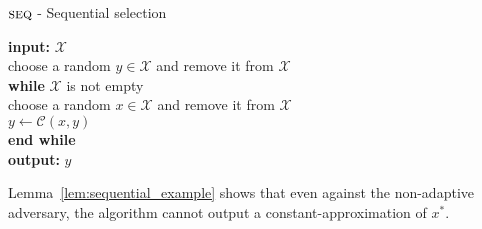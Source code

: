 \documentclass[twoside,11pt]{article}
\newcommand{\cC}{\mathcal{C}}
\newcommand{\cX}{\mathcal{X}}
\newcommand{\algorithms}[1]{\textsc{#1}}
\newcommand{\algseq}{\algorithms{seq}}
\newcommand{\maxx}{x^*}
\begin{document}
\begin{center}
\begin{algorithm}
\caption{$\algseq$ - Sequential selection}
\textbf{input:} $\cX$\\
\qquad choose a random $y\in \cX$ and remove it from $\cX$\\
\qquad\textbf{while} $\cX$ is not empty\\
\qquad\qquad choose a random $x\in \cX$ and remove it from $\cX$\\
\qquad\qquad 	$y\leftarrow\cC(x,y)$\\
\qquad\textbf{end while}\\
\textbf{output:} $y$
\end{algorithm}
\end{center}

Lemma~\ref{lem:sequential_example} shows that even against the non-adaptive adversary,
 the algorithm cannot output a constant-approximation of
$\maxx$.
\end{document}
